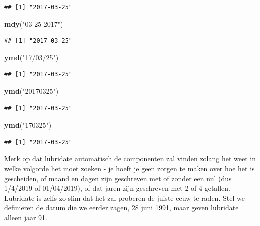 \documentclass[]{tufte-book}
\newenvironment{Shaded}{}{}
\newcommand{\KeywordTok}[1]{\textcolor[rgb]{0.00,0.44,0.13}{\textbf{#1}}}
\newcommand{\NormalTok}[1]{#1}
\newcommand{\StringTok}[1]{\textcolor[rgb]{0.25,0.44,0.63}{#1}}
\begin{document}
\begin{verbatim}
## [1] "2017-03-25"
\end{verbatim}

\begin{Shaded}
\begin{Highlighting}[]
\KeywordTok{mdy}\NormalTok{(}\StringTok{"03-25-2017"}\NormalTok{)}
\end{Highlighting}
\end{Shaded}

\begin{verbatim}
## [1] "2017-03-25"
\end{verbatim}

\begin{Shaded}
\begin{Highlighting}[]
\KeywordTok{ymd}\NormalTok{(}\StringTok{"17/03/25"}\NormalTok{)}
\end{Highlighting}
\end{Shaded}

\begin{verbatim}
## [1] "2017-03-25"
\end{verbatim}

\begin{Shaded}
\begin{Highlighting}[]
\KeywordTok{ymd}\NormalTok{(}\StringTok{"20170325"}\NormalTok{)}
\end{Highlighting}
\end{Shaded}

\begin{verbatim}
## [1] "2017-03-25"
\end{verbatim}

\begin{Shaded}
\begin{Highlighting}[]
\KeywordTok{ymd}\NormalTok{(}\StringTok{"170325"}\NormalTok{)}
\end{Highlighting}
\end{Shaded}

\begin{verbatim}
## [1] "2017-03-25"
\end{verbatim}

Merk op dat lubridate automatisch de componenten zal vinden zolang het weet in welke volgorde het moet zoeken - je hoeft je geen zorgen te maken over hoe het is gescheiden, of maand en dagen zijn geschreven met of zonder een nul (dus 1/4/2019 of 01/04/2019), of dat jaren zijn geschreven met 2 of 4 getallen. Lubridate is zelfs zo slim dat het zal proberen de juiste eeuw te raden. Stel we definiëren de datum die we eerder zagen, 28 juni 1991, maar geven lubridate alleen jaar 91.
\end{document}

